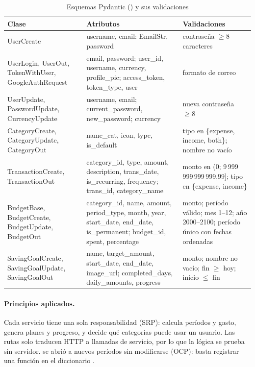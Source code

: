 \begin{table}[H]
\caption{Esquemas Pydantic () y sus validaciones}
\label{tab:schemas}
\footnotesize
\begin{tabularx}{\linewidth}{L{3.3cm} L{5.3cm} Y}
\toprule
Clase & Atributos & Validaciones \\
\midrule
UserCreate & username, email: EmailStr, password & contraseña $\geq 8$ caracteres \\
UserLogin, UserOut, TokenWithUser, GoogleAuthRequest & email, password; user\_id, username, currency, profile\_pic; access\_token, token\_type, user & formato de correo \\
UserUpdate, PasswordUpdate, CurrencyUpdate & username, email; current\_password, new\_password; currency & nueva contraseña $\geq 8$ \\
CategoryCreate, CategoryUpdate, CategoryOut & name\_cat, icon, type, is\_default & tipo en \{expense, income, both\}; nombre no vacío \\
TransactionCreate, TransactionOut & category\_id, type, amount, description, trans\_date, is\_recurring, frequency; trans\_id, category\_name & monto en (0; 9\,999\,999\,999\,999,99]; tipo en \{expense, income\} \\
BudgetBase, BudgetCreate, BudgetUpdate, BudgetOut & category\_id, name, amount, period\_type, month, year, start\_date, end\_date, is\_permanent; budget\_id, spent, percentage & monto; período válido; mes 1–12; año 2000–2100; período único con fechas ordenadas \\
SavingGoalCreate, SavingGoalUpdate, SavingGoalOut & name, target\_amount, start\_date, end\_date, image\_url; completed\_days, daily\_amounts, progress & monto; nombre no vacío; fin $\geq$ hoy; inicio $\leq$ fin \\
\bottomrule
\end{tabularx}
\end{table}

\paragraph{Principios aplicados.} Cada servicio tiene una sola responsabilidad (SRP):  calcula períodos y gasto,  genera planes y progreso, y  decide qué categorías puede usar un usuario. Las rutas solo traducen HTTP a llamadas de servicio, por lo que la lógica se prueba sin servidor.  se abrió a nuevos períodos sin modificarse (OCP): basta registrar una función en el diccionario .

